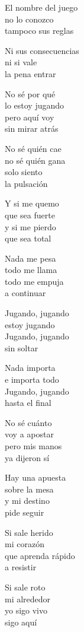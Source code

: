 \begin{lyrics}
El nombre del juego\\
no lo conozco\\
tampoco sus reglas

Ni sus consecuencias\\
ni si vale\\
la pena entrar

No sé por qué\\
lo estoy jugando\\
pero aquí voy\\
sin mirar atrás

No sé quién cae\\
no sé quién gana\\
solo siento\\
la pulsación

Y si me quemo\\
que sea fuerte\\
y si me pierdo\\
que sea total

Nada me pesa\\
todo me llama\\
todo me empuja\\
a continuar

Jugando, jugando\\
estoy jugando\\
Jugando, jugando\\
sin soltar

Nada importa\\
e importa todo\\
Jugando, jugando\\
hasta el final

No sé cuánto\\
voy a apostar\\
pero mis manos\\
ya dijeron sí

Hay una apuesta\\
sobre la mesa\\
y mi destino\\
pide seguir

Si sale herido\\
mi corazón\\
que aprenda rápido\\
a resistir

Si sale roto\\
mi alrededor\\
yo sigo vivo\\
sigo aquí


\end{lyrics}
